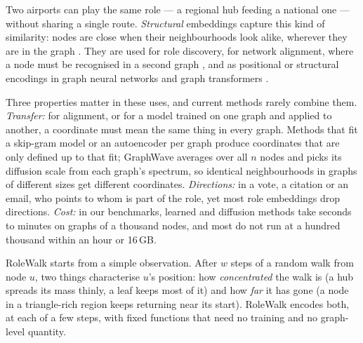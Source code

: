 \documentclass[10pt]{article}
\theoremstyle{definition}
\begin{document}
Two airports can play the same role --- a regional hub feeding a national one --- without sharing a single route.
\emph{Structural} embeddings capture this kind of similarity: nodes are close when their neighbourhoods look alike, wherever they are in the graph \citep{henderson2012,ribeiro2017,donnat2018}.
They are used for role discovery, for network alignment, where a node must be recognised in a second graph \citep{heimann2018,ceylan2022}, and as positional or structural encodings in graph neural networks and graph transformers \citep{dwivedi2022,rampasek2022}.

Three properties matter in these uses, and current methods rarely combine them.
\emph{Transfer:} for alignment, or for a model trained on one graph and applied to another, a coordinate must mean the same thing in every graph.
Methods that fit a skip-gram model or an autoencoder per graph \citep{ribeiro2017,ahmed2018,resd} produce coordinates that are only defined up to that fit; GraphWave \citep{donnat2018} averages over all $n$ nodes and picks its diffusion scale from each graph's spectrum, so identical neighbourhoods in graphs of different sizes get different coordinates.
\emph{Directions:} in a vote, a citation or an email, who points to whom is part of the role, yet most role embeddings drop directions.
\emph{Cost:} in our benchmarks, learned and diffusion methods take seconds to minutes on graphs of a thousand nodes, and most do not run at a hundred thousand within an hour or 16\,GB.

RoleWalk starts from a simple observation.
After $w$ steps of a random walk from node $u$, two things characterise $u$'s position: how \emph{concentrated} the walk is (a hub spreads its mass thinly, a leaf keeps most of it) and how \emph{far} it has gone (a node in a triangle-rich region keeps returning near its start).
RoleWalk encodes both, at each of a few steps, with fixed functions that need no training and no graph-level quantity.
\end{document}
